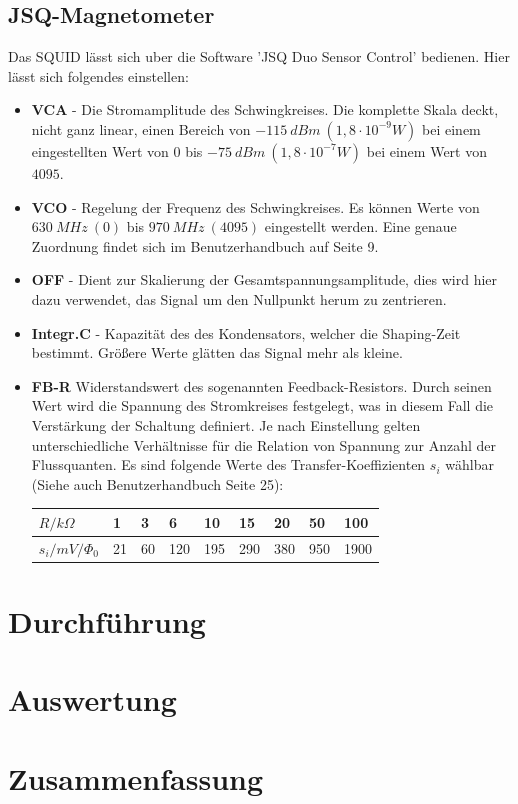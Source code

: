 \documentclass[12pt]{article}
\begin{document}
\subsection{JSQ-Magnetometer}
Das SQUID lässt sich uber die Software ’JSQ Duo Sensor Control’ bedienen. Hier lässt sich folgendes einstellen:
\begin{itemize}
 \item \textbf{VCA} - Die Stromamplitude des Schwingkreises. Die komplette Skala deckt, nicht ganz linear, einen
       Bereich von $-115~dBm ~(1, 8 \cdot 10^{-9} W)$ bei einem eingestellten Wert von $0$ bis $-75~ dBm ~(1,8 \cdot 10^{-7} W)$ bei einem Wert von $4095$.
 \item \textbf{VCO} - Regelung der Frequenz des Schwingkreises. Es können Werte von $630~MHz~(0)$ bis $970~MHz~(4095)$ eingestellt werden. Eine genaue
       Zuordnung findet sich im Benutzerhandbuch auf Seite 9.
 \item \textbf{OFF} - Dient zur Skalierung der Gesamtspannungsamplitude, dies wird hier dazu verwendet, das Signal um den Nullpunkt herum zu zentrieren.
 \item \textbf{Integr.C} - Kapazität des des Kondensators, welcher die Shaping-Zeit bestimmt. Größere Werte glätten das Signal mehr als kleine.
 \item \textbf{FB-R} Widerstandswert des sogenannten Feedback-Resistors. Durch seinen Wert wird die Spannung des Stromkreises festgelegt, was in
       diesem Fall die Verstärkung der Schaltung definiert. Je nach Einstellung gelten unterschiedliche Verhältnisse für die Relation von Spannung
       zur Anzahl der Flussquanten. Es sind folgende Werte des Transfer-Koeffizienten $s_i$ wählbar (Siehe auch Benutzerhandbuch Seite 25):
       \begin{center}
\begin{tabular}{|l|llllllll|}
\hline 
$R / k\Omega$ & 1 & 3 & 6 & 10 & 15 & 20 & 50 & 100\\
\hline 
$s_i / mV / \Phi_0$ & 21 & 60 & 120 & 195 & 290 & 380 & 950 & 1900\\
\hline 
       \end{tabular}
       \end{center}


\end{itemize}



\section{Durchführung}

\section{Auswertung}

\section{Zusammenfassung}
\end{document}
